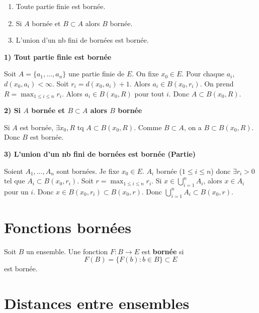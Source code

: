 \documentclass[oneside]{book}
\begin{document}
\begin{proposition}
\begin{enumerate}
    \item Toute partie finie est bornée.
    \item Si $A$ bornée et $B \subset A$ alors $B$ bornée.
    \item L'union d'un nb fini de bornées est bornée.
\end{enumerate}
\end{proposition}

\begin{solution}
[Démonstration:]
\textbf{1) Tout partie finie est bornée}

Soit $A = \{a_1, \dots, a_n\}$ une partie finie de $E$. On fixe $x_0 \in E$.
Pour chaque $a_i$, $d(x_0, a_i) < \infty$. Soit $r_i = d(x_0, a_i) + 1$. Alors $a_i \in B(x_0, r_i)$.
On prend $R = \max_{1 \leq i \leq n} r_i$. Alors $a_i \in B(x_0, R)$ pour tout $i$.
Donc $A \subset B(x_0, R)$.

\textbf{2) Si $A$ bornée et $B \subset A$ alors $B$ bornée}

Si $A$ est bornée, $\exists x_0, R$ tq $A \subset B(x_0, R)$. Comme $B \subset A$, on a $B \subset B(x_0, R)$. Donc $B$ est bornée.

\textbf{3) L'union d'un nb fini de bornées est bornée (Partie)}

Soient $A_1, \dots, A_n$ sont bornées. Je fixe $x_0 \in E$.
$A_i$ bornée ($1 \leq i \leq n$) donc $\exists r_i > 0$ tel que $A_i \subset B(x_0, r_i)$.
Soit $r = \max_{1 \leq i \leq n} r_i$.
Si $x \in \bigcup_{i=1}^n A_i$, alors $x \in A_i$ pour un $i$. Donc $x \in B(x_0, r_i) \subset B(x_0, r)$.
Donc $\bigcup_{i=1}^n A_i \subset B(x_0, r)$.
\end{solution}

\section{Fonctions bornées}

\begin{definition}
Soit $B$ un ensemble. Une fonction $F: B \to E$ est \textbf{bornée} si
\[
F(B) = \{F(b) : b \in B\} \subset E
\]
est bornée.
\end{definition}

\section{Distances entre ensembles}
\end{document}
